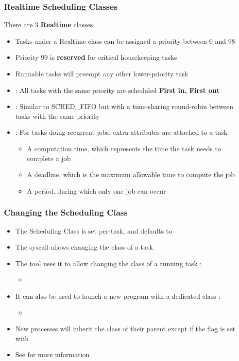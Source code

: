 \begin{frame}
	\frametitle{Realtime Scheduling Classes}
	There are 3 \textbf{Realtime} classes
	\begin{itemize}
		\item Tasks under a Realtime class can be assigned a priority between 0 and 98
		\item Priority 99 is \textbf{reserved} for critical housekeeping tasks
		\item Runnable tasks will preempt any other lower-priority task
		\item {} : All tasks with the same priority are scheduled \textbf{First in, First out}
		\item {} : Similar to SCHED\_FIFO but with a time-sharing round-robin between tasks with the same priority
		\item {} : For tasks doing recurrent jobs, extra attributes are attached to a task
			\begin{itemize}
				\item A computation time, which represents the time the task needs to complete a job
				\item A deadline, which is the maximum allowable time to compute the job
				\item A period, during which only one job can occur
			\end{itemize}
	\end{itemize}
\end{frame}

\begin{frame}
	\frametitle{Changing the Scheduling Class}
	\begin{itemize}
		\item The Scheduling Class is set per-task, and defaults to 
		\item The  syscall allows changing the class of a task
		\item The tool  uses it to allow changing the class of a running task :
			\begin{itemize}
				\item {}
			\end{itemize}
		\item It can also be used to launch a new program with a dedicated class :
			\begin{itemize}
				\item {}
			\end{itemize}
		\item New processes will inherit the class of their parent except if the  flag is set with 
		\item See  for more information
	\end{itemize}
\end{frame}